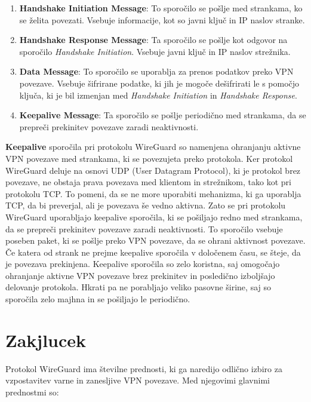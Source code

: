 \documentclass[a4paper, 11pt]{article}
\begin{document}
\begin{enumerate}
    \item \textbf{Handshake Initiation Message}:  To sporočilo se pošlje med strankama, ko se želita povezati. Vsebuje informacije, kot so javni ključ in IP naslov stranke.
    \item \textbf{Handshake Response Message}: Ta sporočilo se pošlje kot odgovor na sporočilo \textit{Handshake Initiation}. Vsebuje javni ključ in IP naslov strežnika.
    \item \textbf{Data Message}: To sporočilo se uporablja za prenos podatkov preko VPN povezave. Vsebuje šifrirane podatke, ki jih je mogoče dešifrirati le s pomočjo ključa, 
        ki je bil izmenjan med \textit{Handshake Initiation} in \textit{Handshake Response}.
    \item \textbf{Keepalive Message}: Ta sporočilo se pošlje periodično med strankama, da se prepreči prekinitev povezave zaradi neaktivnosti.
\end{enumerate}

\textbf{Keepalive} sporočila pri protokolu WireGuard so namenjena ohranjanju aktivne VPN povezave med strankama, ki se povezujeta preko protokola.
Ker protokol WireGuard deluje na osnovi UDP (User Datagram Protocol), ki je protokol brez povezave, ne obstaja prava povezava med klientom in strežnikom, tako kot pri protokolu TCP. To pomeni, da se ne more uporabiti mehanizma, ki ga uporablja TCP, da bi preverjal, ali je povezava še vedno aktivna.
Zato se pri protokolu WireGuard uporabljajo keepalive sporočila, ki se pošiljajo redno med strankama, da se prepreči prekinitev povezave zaradi neaktivnosti. To sporočilo vsebuje poseben paket, ki se pošlje preko VPN povezave, da se ohrani aktivnost povezave. Če katera od strank ne prejme keepalive sporočila v določenem času, se šteje, da je povezava prekinjena.
Keepalive sporočila so zelo koristna, saj omogočajo ohranjanje aktivne VPN povezave brez prekinitev in posledično izboljšajo delovanje protokola. Hkrati pa ne porabljajo veliko pasovne širine, saj so sporočila zelo majhna in se pošiljajo le periodično.
\pagebreak

\section{Zakjlucek}
Protokol WireGuard ima številne prednosti, ki ga naredijo odlično izbiro za vzpostavitev varne in zanesljive VPN povezave. Med njegovimi glavnimi prednostmi so:
\end{document}
